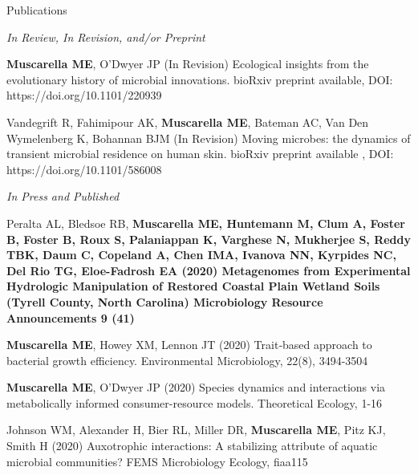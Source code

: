 \documentclass{resume} %
\begin{document}
\pagebreak



\begin{rSection}{Publications}

\emph{In Review, In Revision, and/or Preprint}

{\bf Muscarella ME}, O'Dwyer JP (In Revision) 
Ecological insights from the evolutionary history of microbial innovations. 
bioRxiv preprint available, DOI: https://doi.org/10.1101/220939 

Vandegrift R, Fahimipour AK, {\bf Muscarella ME}, Bateman AC, Van Den Wymelenberg K, 
Bohannan BJM (In Revision)
Moving microbes: the dynamics of transient microbial residence on human skin.
bioRxiv preprint available , DOI: https://doi.org/10.1101/586008 

\emph{In Press and Published}

Peralta AL, Bledsoe RB, \bf{Muscarella ME}, Huntemann M, Clum A, Foster B, Foster B, Roux S, Palaniappan K, Varghese N, Mukherjee S, Reddy TBK,  Daum C, Copeland A, Chen IMA, Ivanova NN, Kyrpides NC, Del Rio TG, Eloe-Fadrosh EA (2020)
Metagenomes from Experimental Hydrologic Manipulation of Restored Coastal Plain Wetland Soils (Tyrell County, North Carolina)
Microbiology Resource Announcements 9 (41)

{\bf Muscarella ME}, Howey XM, Lennon JT (2020) 
Trait‐based approach to bacterial growth efficiency.
Environmental Microbiology, 22(8), 3494-3504

{\bf Muscarella ME}, O'Dwyer JP (2020) 
Species dynamics and interactions via metabolically informed consumer-resource models. 
Theoretical Ecology, 1-16

Johnson WM, Alexander H, Bier RL, Miller DR, {\bf Muscarella ME}, Pitz KJ, Smith H (2020)
Auxotrophic interactions: A stabilizing attribute of aquatic microbial communities?
FEMS Microbiology Ecology, fiaa115


\end{rSection}
\end{document}
